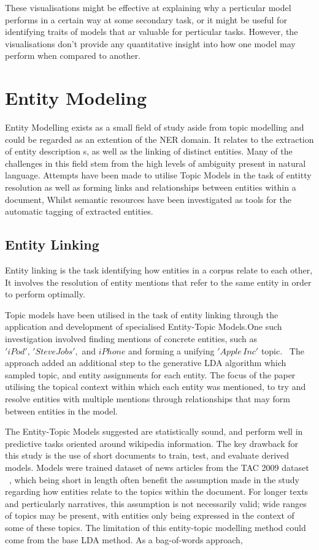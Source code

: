 \documentclass[10pt]{report}
\begin{document}
\renewcommand{\baselinestretch}{2.0}\normalsize
These visualisations might be effective at explaining why a perticular model performs in a certain way at some secondary task, or it might be useful for identifying traits of models that ar valuable for perticular tasks. However, the visualisations don't provide any quantitative insight into how one model may perform when compared to another.

\section{Entity Modeling}
Entity Modelling exists as a small field of study aside from topic modelling and could be regarded as an extention of the NER domain. It relates to the extraction of entity description s, as well as the linking of distinct entities. Many of the challenges in this field stem from the high levels of ambiguity present in natural language. Attempts have been made to utilise Topic Models in the task of entitty resolution as well as forming links and relationships between entities within a document, Whilst semantic resources have been investigated as tools for the automatic tagging of extracted entities.

\subsection{Entity Linking}
Entity linking is the task identifying how entities in a corpus relate to each other, It involves the resolution of entity mentions that refer to the same entity in order to perform optimally.

Topic models have been utilised in the task of entity linking through the application and development of specialised Entity-Topic Models.One such investigation involved finding mentions of concrete entities, such as \('iPod',\, 'Steve Jobs',\) and \(iPhone\) and forming a unifying \('Apple\, Inc'\) topic.~\cite{Han2012-gy} The approach added an additional step to the generative LDA algorithm which sampled topic, and entity assignments for each entity. The focus of the paper utilising the topical context within which each entity was mentioned, to try and resolve entities with multiple mentions through relationships that may form between entities in the model.

The Entity-Topic Models suggested are statistically sound, and perform well in predictive tasks oriented around wikipedia information. The key drawback for this study is the use of short documents to train, test, and evaluate derived models. Models were trained dataset of news articles from the TAC 2009 dataset ~\cite{Macnamee-pd}, which being short in length often benefit the assumption made in the study regarding how entities relate to the topics within the document. For longer texts and perticularly narratives, this assumption is not necessarily valid; wide ranges of topics may be present, with entities only being expressed in the context of some of these topics. The limitation of this entity-topic modelling method could come from the base LDA method. As a bag-of-words approach, 
\end{document}
